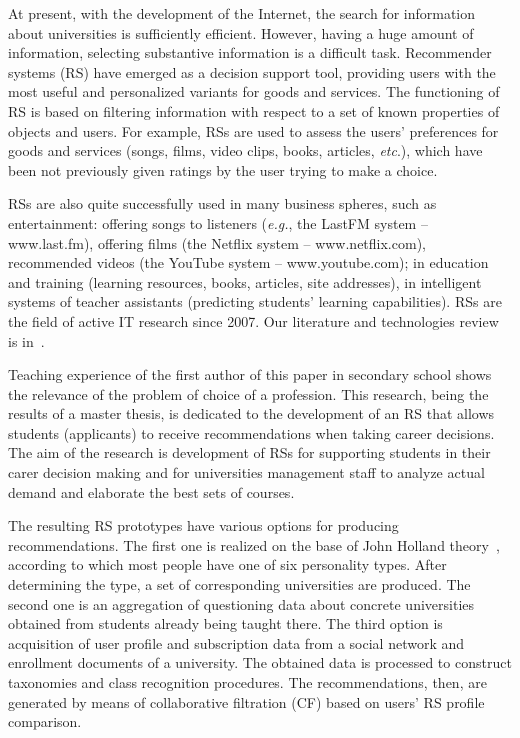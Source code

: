 \documentclass[conference,a4]{IEEEtran}
\begin{document}
At present, with the development of the Internet, the search for information about universities is sufficiently efficient. However, having a huge amount of information, selecting substantive information is a difficult task.  Recommender systems (RS) have emerged as a decision support tool, providing users with the most useful and personalized variants for goods and services.  The functioning of RS is based on filtering information with respect to a set of known properties of objects and users.  For example, RSs are used to assess the users' preferences for goods and services (songs, films, video clips, books, articles, \emph{etc}.), which have been not previously given ratings by the user trying to make a choice.

RSs are also quite successfully used in many business spheres, such as entertainment: offering songs to listeners (\emph{e.g.}, the LastFM system -- www.last.fm), offering films (the Netflix system -- www.netflix.com), recommended videos (the YouTube system -- www.youtube.com); in education and training (learning resources, books, articles, site addresses), in intelligent systems of teacher assistants (predicting students' learning capabilities).  RSs are the field of active IT research since 2007.  Our literature and technologies review is in~\cite{review}.

Teaching experience of the first author of this paper in secondary school shows the relevance of the problem of choice of a profession.  This research, being the results of a master thesis, is dedicated to the development of an RS that allows students (applicants) to receive recommendations when taking career decisions.  The aim of the research is development of RSs for supporting students in their carer decision making and for universities management staff to analyze actual demand and elaborate the best sets of courses.

The resulting RS prototypes have various options for producing recommendations. The first one is realized on the base of John Holland theory~\cite{holland}, according to which most people have one of six personality types.  After determining the type, a set of corresponding universities are produced.  The second one is an aggregation of questioning data about concrete universities obtained from students already being taught there.  The third option is acquisition of user profile and subscription data from a social network and enrollment documents of a university.  The obtained data is processed to construct taxonomies and class recognition procedures.  The recommendations, then, are generated by means of collaborative filtration (CF) based on users' RS profile comparison.
\end{document}
